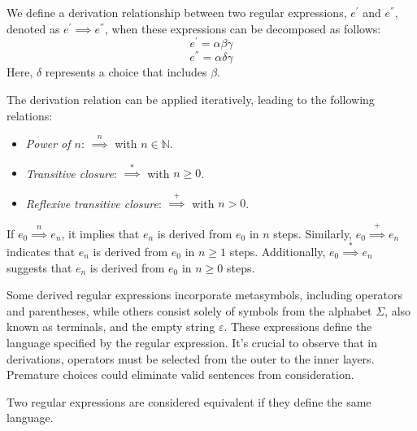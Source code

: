 \begin{definition}
    We define a derivation relationship between two regular expressions, $e^{'}$ and $e^{''}$, denoted as $e^{'} \implies e^{''}$,  when these expressions can be decomposed as follows:
    \[e^{'}=\alpha \beta \gamma\]
    \[e^{''}=\alpha \delta \gamma\]
    Here, $\delta$ represents a choice that includes $\beta$.
\end{definition}
The derivation relation can be applied iteratively, leading to the following relations:
\begin{itemize}
    \item \textit{Power of $n$}: $\overset{n}{\implies}$ with $n \in \mathbb{N}$. 
    \item \textit{Transitive closure}: $\overset{*}{\implies}$ with $n \geq 0$. 
    \item \textit{Reflexive transitive closure}: $\overset{+}{\implies}$ with $n > 0$.
\end{itemize}
\begin{example}
    If $e_0 \overset{n}{\implies} e_n$, it implies that $e_n$ is derived from $e_0$ in $n$ steps.
    Similarly, $e_0 \overset{+}{\implies} e_n$ indicates that $e_n$ is derived from $e_0$ in $n \geq 1$ steps.
    Additionally, $e_0 \overset{*}{\implies} e_n$ suggests that $e_n$ is derived from $e_0$ in $n \geq 0$ steps.
\end{example}
Some derived regular expressions incorporate metasymbols, including operators and parentheses, while others consist solely of symbols from the alphabet $\Sigma$, also known as terminals, and the empty string $\varepsilon$. 
These expressions define the language specified by the regular expression.
It's crucial to observe that in derivations, operators must be selected from the outer to the inner layers. 
Premature choices could eliminate valid sentences from consideration.
\begin{definition}
    Two regular expressions are considered equivalent if they define the same language. 
\end{definition}

